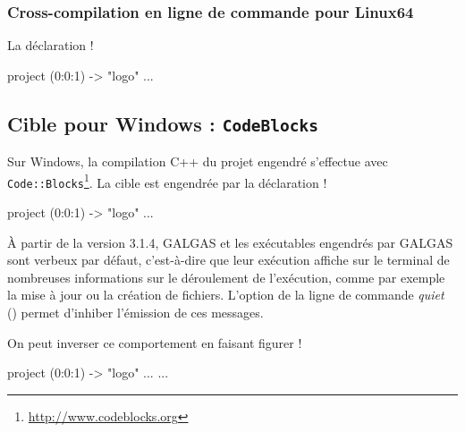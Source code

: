 \subsubsection{Cross-compilation en ligne de commande pour Linux64}

La déclaration \ggs!%

\begin{galgas}
project (0:0:1) -> "logo" {
  ...
}
\end{galgas}



\subsection{Cible pour Windows : \texttt{CodeBlocks}}

Sur Windows, la compilation C++ du projet engendré s'effectue avec \texttt{Code{}::Blocks}\footnote{\url{http://www.codeblocks.org}}. La cible est engendrée par la déclaration \ggs!%

\begin{galgas}
project (0:0:1) -> "logo" {
  ...
}
\end{galgas}






À partir de la version 3.1.4, GALGAS et les exécutables engendrés par GALGAS sont verbeux par défaut, c'est-à-dire que leur exécution affiche sur le terminal de nombreuses informations sur le déroulement de l'exécution, comme par exemple la mise à jour ou la création de fichiers. L'option de la ligne de commande \emph{quiet} () permet d'inhiber l'émission de ces messages.

On peut inverser ce comportement en faisant figurer \ggs!%
\begin{galgas}
project (0:0:1) -> "logo" {
  ...
  ...
}
\end{galgas}

